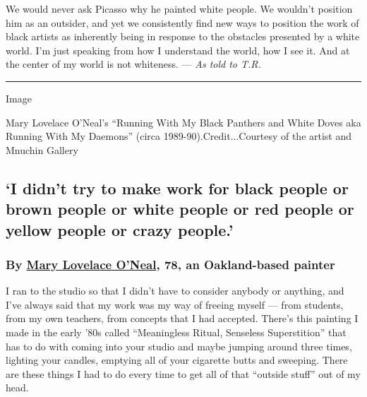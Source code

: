 We would never ask Picasso why he painted white people. We wouldn't
position him as an outsider, and yet we consistently find new ways to
position the work of black artists as inherently being in response to
the obstacles presented by a white world. I'm just speaking from how I
understand the world, how I see it. And at the center of my world is not
whiteness. --- \emph{As told to T.R.}

\begin{center}\rule{0.5\linewidth}{\linethickness}\end{center}

Image

Mary Lovelace O'Neal's ``Running With My Black Panthers and White Doves
aka Running With My Daemons'' (circa 1989-90).Credit...Courtesy of the
artist and Mnuchin Gallery

\hypertarget{i-didnt-try-to-make-work-for-black-people-or-brown-people-or-white-people-or-red-people-or-yellow-people-or-crazy-people}{%
\subsection{`I didn't try to make work for black people or brown people
or white people or red people or yellow people or crazy
people.'}\label{i-didnt-try-to-make-work-for-black-people-or-brown-people-or-white-people-or-red-people-or-yellow-people-or-crazy-people}}

\hypertarget{by-mary-lovelace-oneal-78-an-oakland-based-painter}{%
\subsubsection{\texorpdfstring{\textbf{By}
\textbf{\href{http://www.mnuchingallery.com/exhibitions/mary-lovelace-oand39neal?j=42038704\&sfid=003i000004Bs34GAAR\&sfmc_sub=21111890\&l=1368034_HTML\&u=459507965\&mid=10902205\&jb=1}{Mary
Lovelace O'Neal}, 78, an Oakland-based
painter}}{By Mary Lovelace O'Neal, 78, an Oakland-based painter}}\label{by-mary-lovelace-oneal-78-an-oakland-based-painter}}

I ran to the studio so that I didn't have to consider anybody or
anything, and I've always said that my work was my way of freeing myself
--- from students, from my own teachers, from concepts that I had
accepted. There's this painting I made in the early '80s called
``Meaningless Ritual, Senseless Superstition'' that has to do with
coming into your studio and maybe jumping around three times, lighting
your candles, emptying all of your cigarette butts and sweeping. There
are these things I had to do every time to get all of that ``outside
stuff'' out of my head.

